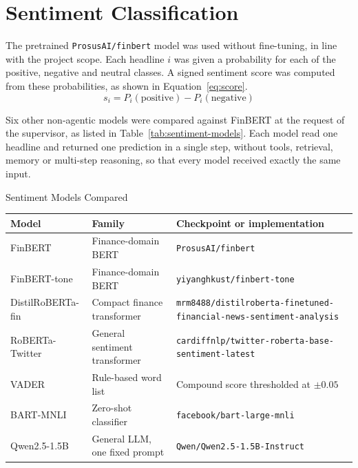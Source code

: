 \section{Sentiment Classification}
\label{sec:sentiment}
The pretrained \texttt{ProsusAI/finbert} model \parencite{araci2019finbert} was used without fine-tuning, in line with the project scope. Each headline $i$ was given a probability for each of the positive, negative and neutral classes. A signed sentiment score was computed from these probabilities, as shown in Equation~\ref{eq:score}.
\begin{equation}
s_i = P_i(\text{positive}) - P_i(\text{negative})
\label{eq:score}
\end{equation}

Six other non-agentic models were compared against FinBERT at the request of the supervisor, as listed in Table~\ref{tab:sentiment-models}. Each model read one headline and returned one prediction in a single step, without tools, retrieval, memory or multi-step reasoning, so that every model received exactly the same input.

\begin{utptable}{Sentiment Models Compared}
\label{tab:sentiment-models}
\begin{tabular}{@{}P{2.9cm}P{3.4cm}P{7.3cm}@{}}
\toprule
\textbf{Model} & \textbf{Family} & \textbf{Checkpoint or implementation} \\
\midrule
FinBERT & Finance-domain BERT & \nolinkurl{ProsusAI/finbert} \parencite{araci2019finbert} \\
FinBERT-tone & Finance-domain BERT & \nolinkurl{yiyanghkust/finbert-tone} \parencite{yang2020finbert} \\
DistilRoBERTa-fin & Compact finance transformer & \texttt{mrm8488/\allowbreak distilroberta-\allowbreak finetuned-\allowbreak financial-\allowbreak news-\allowbreak sentiment-\allowbreak analysis} \\
RoBERTa-Twitter & General sentiment transformer & \texttt{cardiffnlp/\allowbreak twitter-roberta-base-sentiment-latest} \parencite{loureiro2022timelms} \\
VADER & Rule-based word list & Compound score thresholded at $\pm 0.05$ \parencite{hutto2014vader} \\
BART-MNLI & Zero-shot classifier & \nolinkurl{facebook/bart-large-mnli} \parencite{lewis2020bart,yin2019benchmarking} \\
Qwen2.5-1.5B & General LLM, one fixed prompt & \nolinkurl{Qwen/Qwen2.5-1.5B-Instruct} \parencite{qwen2024technical} \\
\bottomrule
\end{tabular}
\end{utptable}

